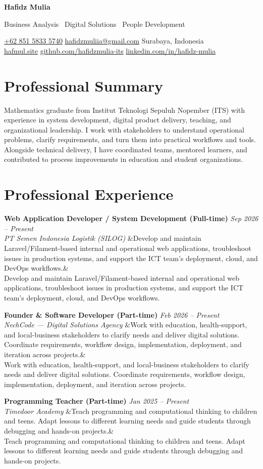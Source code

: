 \documentclass[a4paper,11pt]{article}
\newcommand{\cvname}[1]{%
  {\centering\LARGE\bfseries #1\par\vspace{2pt}}%
}
\newcommand{\cvtitle}[1]{%
  {\centering\large\color{accent} #1\par\vspace{4pt}}%
}
\newcommand{\cvcontact}[1]{%
  {\centering\small #1\par\vspace{10pt}}%
}
\newcommand{\cventry}[4]{%
  \noindent\textbf{#1} \hfill \textit{#3} \\
  \textit{#2}
  \ifx&#4& \else \\ \small #4 \fi
  \vspace{10pt}
}
\begin{document}
\cvname{Hafidz Mulia}
\cvtitle{Business Analysis \textbar\ Digital Solutions \textbar\ People Development}
\cvcontact{%
  \href{tel:+6285158335740}{+62 851 5833 5740} \quad\textbar\quad
  \href{mailto:hafidzmuliia@gmail.com}{hafidzmuliia@gmail.com} \quad\textbar\quad
  Surabaya, Indonesia \\
  \href{https://hafmul.site}{hafmul.site} \quad\textbar\quad
  \href{https://github.com/hafidzmulia-its}{github.com/hafidzmulia-its} \quad\textbar\quad
  \href{https://www.linkedin.com/in/hafidz-mulia/}{linkedin.com/in/hafidz-mulia}
}

\section{Professional Summary}
Mathematics graduate from Institut Teknologi Sepuluh Nopember (ITS) with experience in system development, digital product delivery, teaching, and organizational leadership. I work with stakeholders to understand operational problems, clarify requirements, and turn them into practical workflows and tools. Alongside technical delivery, I have coordinated teams, mentored learners, and contributed to process improvements in education and student organizations.

\section{Professional Experience}

\cventry
  {Web Application Developer / System Development (Full-time)}
  {PT Semen Indonesia Logistik (SILOG)}
  {Sep 2026 -- Present}
  {Develop and maintain Laravel/Filament-based internal and operational web applications, troubleshoot issues in production systems, and support the ICT team's deployment, cloud, and DevOps workflows.}

\cventry
  {Founder \& Software Developer (Part-time)}
  {NechCode --- Digital Solutions Agency}
  {Feb 2026 -- Present}
  {Work with education, health-support, and local-business stakeholders to clarify needs and deliver digital solutions. Coordinate requirements, workflow design, implementation, deployment, and iteration across projects.}

\cventry
  {Programming Teacher (Part-time)}
  {Timedoor Academy}
  {Jan 2025 -- Present}
  {Teach programming and computational thinking to children and teens. Adapt lessons to different learning needs and guide students through debugging and hands-on projects.}
\end{document}

